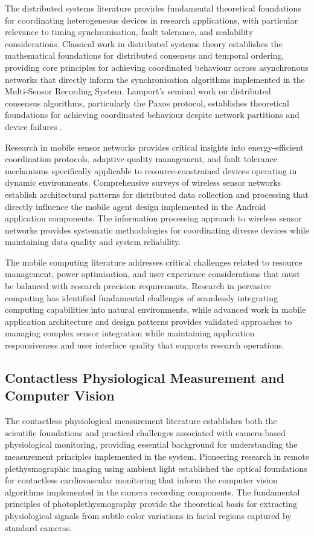 \documentclass[11pt,a4paper]{report}
\begin{document}
The distributed systems literature provides fundamental theoretical foundations for coordinating heterogeneous devices in research applications, with particular relevance to timing synchronisation, fault tolerance, and scalability considerations. Classical work in distributed systems theory establishes the mathematical foundations for distributed consensus and temporal ordering, providing core principles for achieving coordinated behaviour across asynchronous networks that directly inform the synchronisation algorithms implemented in the Multi-Sensor Recording System. Lamport's seminal work on distributed consensus algorithms, particularly the Paxos protocol, establishes theoretical foundations for achieving coordinated behaviour despite network partitions and device failures \cite{lamport1998paxos}.

Research in mobile sensor networks provides critical insights into energy-efficient coordination protocols, adaptive quality management, and fault tolerance mechanisms specifically applicable to resource-constrained devices operating in dynamic environments. Comprehensive surveys of wireless sensor networks establish architectural patterns for distributed data collection and processing that directly influence the mobile agent design implemented in the Android application components. The information processing approach to wireless sensor networks provides systematic methodologies for coordinating diverse devices while maintaining data quality and system reliability.

The mobile computing literature addresses critical challenges related to resource management, power optimisation, and user experience considerations that must be balanced with research precision requirements. Research in pervasive computing has identified fundamental challenges of seamlessly integrating computing capabilities into natural environments, while advanced work in mobile application architecture and design patterns provides validated approaches to managing complex sensor integration while maintaining application responsiveness and user interface quality that supports research operations.

\subsection{Contactless Physiological Measurement and Computer Vision}

The contactless physiological measurement literature establishes both the scientific foundations and practical challenges associated with camera-based physiological monitoring, providing essential background for understanding the measurement principles implemented in the system. Pioneering research in remote plethysmographic imaging using ambient light established the optical foundations for contactless cardiovascular monitoring that inform the computer vision algorithms implemented in the camera recording components. The fundamental principles of photoplethysmography provide the theoretical basis for extracting physiological signals from subtle color variations in facial regions captured by standard cameras.
\end{document}
